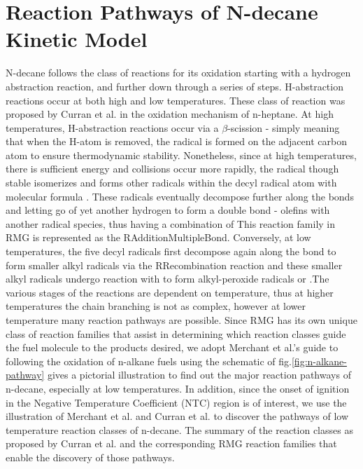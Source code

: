 \section{Reaction Pathways of N-decane Kinetic Model}
N-decane follows the class of reactions for its oxidation starting with a hydrogen abstraction reaction, and further down through a series of steps. H-abstraction reactions occur at both high and low temperatures. These class of reaction was proposed by Curran et al.\cite{Curran1998AOxidation} in the oxidation mechanism of n-heptane. At high temperatures, H-abstraction reactions occur via a $\beta$-scission - simply meaning that when the H-atom is removed, the radical is formed on the adjacent carbon atom to ensure thermodynamic stability. Nonetheless, since at high temperatures, there is sufficient energy and collisions occur more rapidly, the radical though stable isomerizes and forms other radicals within the decyl radical atom with molecular formula . These radicals eventually decompose further along the  bonds and letting go of yet another hydrogen to form a double bond - olefins with another radical species, thus having a combination of
This reaction family in RMG is represented as the R\textunderscore Addition\textunderscore MultipleBond.  Conversely, at low temperatures, the five decyl radicals first decompose again along the  bond to form smaller alkyl radicals via the R\textunderscore Recombination reaction and these smaller alkyl radicals undergo reaction with to form alkyl-peroxide radicals or .The various stages of the reactions are dependent on temperature, thus at higher temperatures the chain branching is not as complex, however at lower temperature many reaction pathways are possible. Since RMG has its own unique class of reaction families that assist in determining which reaction classes guide the fuel molecule to the products desired, we adopt Merchant et al.'s \cite{Merchant2015UnderstandingPropane} guide to following the oxidation of n-alkane fuels using the schematic of fig.\ref{fig:n-alkane-pathway} gives a pictorial illustration to find out the major reaction pathways of n-decane, especially at low temperatures. In addition, since the onset of ignition in the Negative Temperature Coefficient (NTC) region is of interest, we use the illustration of Merchant et al.\cite{Merchant2015UnderstandingPropane} and Curran et al.\cite{Curran1998AOxidation} to discover the pathways of low temperature reaction classes of n-decane. The summary of the reaction classes as proposed by Curran et al.\cite{Curran1998AOxidation} and the corresponding RMG reaction families that enable the discovery of those pathways.

